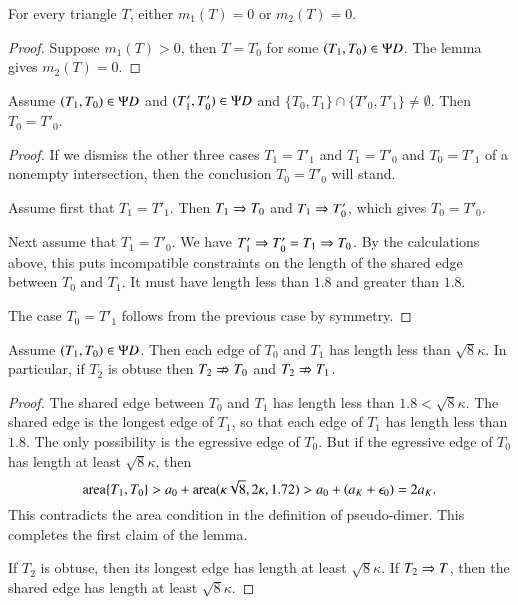 \begin{corollary}  For every triangle $T$, either $m_1(T)=0$ or $m_2(T)=0$.
\end{corollary}

\begin{proof}  Suppose $m_1(T)>0$, then $T=T_0$ for some $(T_1,T_0)\in\Psi D$.  The
lemma gives $m_2(T)=0$.
\end{proof}

\begin{lemma}  Assume $(T_1,T_0)\in \Psi D$ and $(T'_1,T'_0)\in\Psi D$ and
$\{T_0,T_1\}\cap\{T'_0,T'_1\} \ne \emptyset$.  Then $T_0 = T'_0$.
\end{lemma}

\begin{proof}  If we dismiss the other three cases $T_1=T'_1$ and $T_1=T'_0$ and $T_0=T'_1$ of a nonempty
intersection, then the conclusion $T_0 = T'_0$ will stand.

Assume first that $T_1 = T'_1$.  Then $T_1\Rightarrow T_0$ and $T_1\Rightarrow T'_0$, which gives $T_0=T'_0$.

Next assume that $T_1=T'_0$.  We have $T'_1\Rightarrow T'_0 = T_1 \Rightarrow T_0$.  By the calculations above,
this puts incompatible constraints on the length of the shared edge between $T_0$ and $T_1$.  It must have
length less than $1.8$ and greater than $1.8$.

The case $T_0=T'_1$ follows from the previous case by symmetry.
\end{proof}

\begin{lemma}
Assume $(T_1,T_0)\in\Psi D$.  Then each edge of $T_0$ and $T_1$ has length less than $\sqrt8\kappa$.
In particular, if  $T_2$ is obtuse then  $T_2\nRightarrow T_0$ and $T_2 \nRightarrow T_1$.
\end{lemma}

\begin{proof}  The shared edge between $T_0$ and $T_1$ has length less than $1.8 < \sqrt8\kappa$.  The shared
edge is the longest edge of $T_1$, so that each edge of $T_1$ has length less than $1.8$.
The only possibility is the egressive edge of $T_0$.  But if the egressive edge of $T_0$ has length at least $\sqrt8\kappa$,
then
\[
{\operatorname{area}}\{T_1,T_0\} > a_0 + {\operatorname{area}}(\kappa\sqrt8,2\kappa,1.72) > a_0 + (a_K + \epsilon_0) = 2a_K.
\]
This contradicts the area condition in the definition of pseudo-dimer.  This completes the first claim of the lemma.

If $T_2$ is obtuse, then its longest edge has length at least $\sqrt8\kappa$.  If $T_2\Rightarrow T$, then the shared edge
has length at least $\sqrt8\kappa$.
\end{proof}

